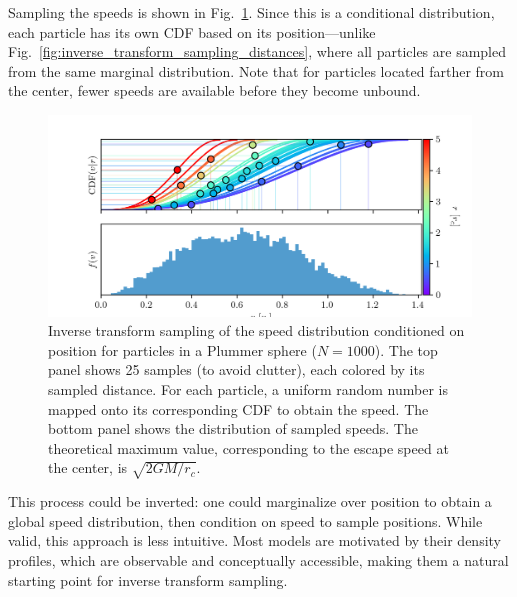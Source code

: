             Sampling the speeds is shown in Fig.~\ref{fig:inverse_transform_sampling_velocities}. Since this is a conditional distribution, each particle has its own CDF based on its position—unlike Fig.~\ref{fig:inverse_transform_sampling_distances}, where all particles are sampled from the same marginal distribution. Note that for particles located farther from the center, fewer speeds are available before they become unbound.

            \begin{figure}
                \includegraphics[width=\linewidth]{images/inverse_transform_sampling_velocities.png}
                \caption{Inverse transform sampling of the speed distribution conditioned on position for particles in a Plummer sphere ($N = 1000$). The top panel shows 25 samples (to avoid clutter), each colored by its sampled distance. For each particle, a uniform random number is mapped onto its corresponding CDF to obtain the speed. The bottom panel shows the distribution of sampled speeds. The theoretical maximum value, corresponding to the escape speed at the center, is $\sqrt{2GM/r_c}$.}
                \label{fig:inverse_transform_sampling_velocities}
            \end{figure}

            This process could be inverted: one could marginalize over position to obtain a global speed distribution, then condition on speed to sample positions. While valid, this approach is less intuitive. Most models are motivated by their density profiles, which are observable and conceptually accessible, making them a natural starting point for inverse transform sampling.
            
